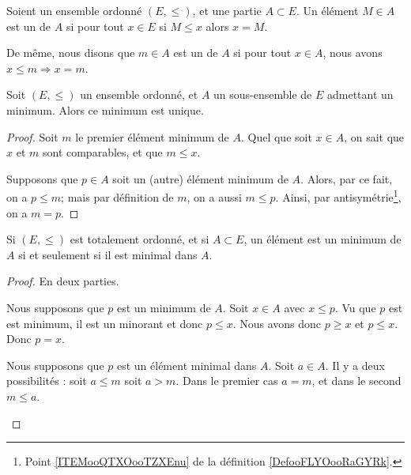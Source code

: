 \begin{definition}        \label{DEFooBZNRooYRPGme}
	Soient un ensemble ordonné \( (E,\leq)\), et une partie \( A\subset E\). Un élément \(M\in A\) est un  de \( A\) si pour tout \( x\in E\) si \( M\leq x\) alors \(x=M\).

	De même, nous disons que \( m\in A\) est un  de \( A\) si pour tout \( x\in A\), nous avons \( x\leq m\Rightarrow x=m\).
\end{definition}


\begin{proposition}\label{PROPooUniciteMinMax}
	Soit \( (E, \leq) \) un ensemble ordonné, et \( A \) un sous-ensemble de \( E \) admettant un minimum. Alors ce minimum est unique.
\end{proposition}

\begin{proof}
	Soit \( m \) le premier élément minimum de \( A \). Quel que soit \(x \in A \), on sait que \( x \) et \( m \) sont comparables, et que \( m \leq x \).

	Supposons que \( p \in A \) soit un (autre) élément minimum de \( A \). Alors, par ce fait, on a \( p \leq m \); mais par définition de \( m \), on a aussi \( m \leq p \). Ainsi, par antisymétrie\footnote{Point \ref{ITEMooQTXOooTZXEnu} de la définition \ref{DefooFLYOooRaGYRk}.}, on a \( m = p\).
\end{proof}

\begin{proposition}	\label{PROPooUJJEooPBUenw}
	Si \( (E,\leq)\) est totalement ordonné, et si \( A\subset E\), un élément est un minimum de \( A\) si et seulement si il est minimal dans \( A\).
\end{proposition}

\begin{proof}
	En deux parties.
	\begin{subproof}
		\spitem[\( \Rightarrow\)]
		Nous supposons que \( p\) est un minimum de \( A\). Soit \( x\in A\) avec \( x\leq p\). Vu que \( p\) est est minimum, il est un minorant et donc \( p\leq x\). Nous avons donc \( p\geq x\) et \( p\leq x\). Donc \( p=x\).

		\spitem[\( \Leftarrow\)]
		Nous supposons que \( p\) est un élément minimal dans \( A\). Soit \( a\in A\). Il y a deux possibilités : soit \( a\leq m\) soit \( a>m\). Dans le premier cas \( a=m\), et dans le second \( m\leq a\).
	\end{subproof}
\end{proof}

